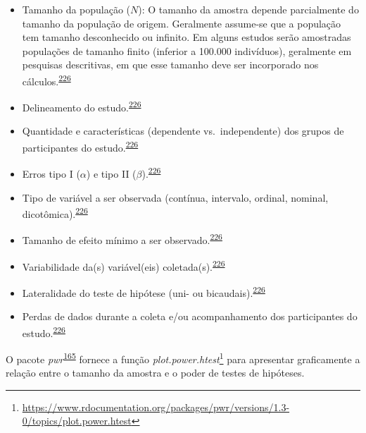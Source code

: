 \documentclass[
  a4paper,
]{book}
\renewcommand{\href}[2]{#2\footnote{\url{#1}}}
\newenvironment{infobox}[1]
  {
  \begin{itemize}
  \renewcommand{\labelitemi}{
    \raisebox{-.7\height}[0pt][0pt]{
      {\setkeys{Gin}{width=3em,keepaspectratio}
        \texttt{[image: \#1]}}
    }
  }
  \setlength{\fboxsep}{1em}
  \begin{blackbox}
  \item
  }
  {
  \end{blackbox}
  \end{itemize}
  }
\begin{document}
\begin{itemize}
\item
  Tamanho da população (\(N\)): O tamanho da amostra depende parcialmente do tamanho da população de origem. Geralmente assume-se que a população tem tamanho desconhecido ou infinito. Em alguns estudos serão amostradas populações de tamanho finito (inferior a 100.000 indivíduos), geralmente em pesquisas descritivas, em que esse tamanho deve ser incorporado nos cálculos.\textsuperscript{\protect\hyperlink{ref-rodruxedguezdeluxe1guila2014}{226}}
\item
  Delineamento do estudo.\textsuperscript{\protect\hyperlink{ref-rodruxedguezdeluxe1guila2014}{226}}
\item
  Quantidade e características (dependente vs.~independente) dos grupos de participantes do estudo.\textsuperscript{\protect\hyperlink{ref-rodruxedguezdeluxe1guila2014}{226}}
\item
  Erros tipo I (\(\alpha\)) e tipo II (\(\beta\)).\textsuperscript{\protect\hyperlink{ref-rodruxedguezdeluxe1guila2014}{226}}
\item
  Tipo de variável a ser observada (contínua, intervalo, ordinal, nominal, dicotômica).\textsuperscript{\protect\hyperlink{ref-rodruxedguezdeluxe1guila2014}{226}}
\item
  Tamanho de efeito mínimo a ser observado.\textsuperscript{\protect\hyperlink{ref-rodruxedguezdeluxe1guila2014}{226}}
\item
  Variabilidade da(s) variável(eis) coletada(s).\textsuperscript{\protect\hyperlink{ref-rodruxedguezdeluxe1guila2014}{226}}
\item
  Lateralidade do teste de hipótese (uni- ou bicaudais).\textsuperscript{\protect\hyperlink{ref-rodruxedguezdeluxe1guila2014}{226}}
\item
  Perdas de dados durante a coleta e/ou acompanhamento dos participantes do estudo.\textsuperscript{\protect\hyperlink{ref-rodruxedguezdeluxe1guila2014}{226}}
\end{itemize}

\begin{infobox}{images/Rlogo}
O pacote \emph{pwr}\textsuperscript{\protect\hyperlink{ref-pwr}{165}} fornece a função \href{https://www.rdocumentation.org/packages/pwr/versions/1.3-0/topics/plot.power.htest}{\emph{plot.power.htest}} para apresentar graficamente a relação entre o tamanho da amostra e o poder de testes de hipóteses.

\end{infobox}
\end{document}
